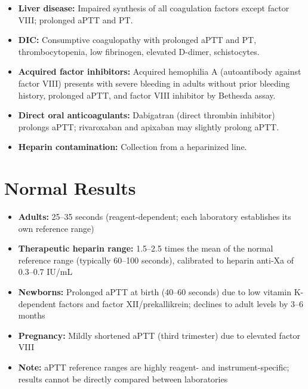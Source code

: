 \begin{itemize}
  \item \textbf{Liver disease:} Impaired synthesis of all coagulation factors except factor VIII; prolonged aPTT and PT.
  \item \textbf{DIC:} Consumptive coagulopathy with prolonged aPTT and PT, thrombocytopenia, low fibrinogen, elevated D-dimer, schistocytes.
  \item \textbf{Acquired factor inhibitors:} Acquired hemophilia A (autoantibody against factor VIII) presents with severe bleeding in adults without prior bleeding history, prolonged aPTT, and factor VIII inhibitor by Bethesda assay.
  \item \textbf{Direct oral anticoagulants:} Dabigatran (direct thrombin inhibitor) prolongs aPTT; rivaroxaban and apixaban may slightly prolong aPTT.
  \item \textbf{Heparin contamination:} Collection from a heparinized line.
\end{itemize}

\section*{Normal Results}
\begin{itemize}
  \item \textbf{Adults:} 25--35 seconds (reagent-dependent; each laboratory establishes its own reference range)
  \item \textbf{Therapeutic heparin range:} 1.5--2.5 times the mean of the normal reference range (typically 60--100 seconds), calibrated to heparin anti-Xa of 0.3--0.7 IU/mL
  \item \textbf{Newborns:} Prolonged aPTT at birth (40--60 seconds) due to low vitamin K-dependent factors and factor XII/prekallikrein; declines to adult levels by 3--6 months
  \item \textbf{Pregnancy:} Mildly shortened aPTT (third trimester) due to elevated factor VIII
  \item \textbf{Note:} aPTT reference ranges are highly reagent- and instrument-specific; results cannot be directly compared between laboratories
\end{itemize}

